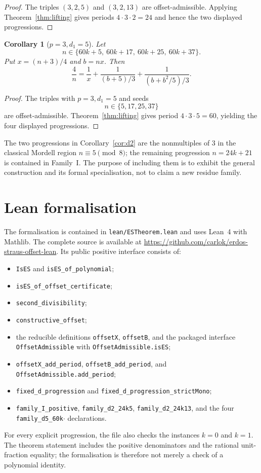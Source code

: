 \documentclass[11pt]{article}
\newtheorem{corollary}[theorem]{Corollary}
\theoremstyle{remark}
\begin{document}
\begin{proof}
The triples \((3,2,5)\) and \((3,2,13)\) are offset-admissible.  Applying
Theorem~\ref{thm:lifting} gives periods \(4\cdot3\cdot2=24\) and hence the two
displayed progressions.
\end{proof}

\begin{corollary}[\(p=3,d_1=5\)]\label{cor:d5}
Let
\[
  n\in
  \{60k+5,\ 60k+17,\ 60k+25,\ 60k+37\}.
\]
Put \(x=(n+3)/4\) and \(b=nx\).  Then
\[
  \frac4n
  =\frac1x
   +\frac1{(b+5)/3}
   +\frac1{(b+b^2/5)/3}.
\]
\end{corollary}

\begin{proof}
The triples with \(p=3,d_1=5\) and seeds
\[
  n\in\{5,17,25,37\}
\]
are offset-admissible.  Theorem~\ref{thm:lifting} gives period
\(4\cdot3\cdot5=60\), yielding the four displayed progressions.
\end{proof}

The two progressions in Corollary~\ref{cor:d2} are the nonmultiples of \(3\)
in the classical Mordell region \(n\equiv5\pmod8\); the remaining progression
\(n=24k+21\) is contained in Family~I.  The purpose of including them is to
exhibit the general construction and its formal specialisation, not to claim a
new residue family.

\section{Lean formalisation}

The formalisation is contained in \texttt{lean/ESTheorem.lean} and uses Lean~4
with Mathlib.  The complete source is available at
\url{https://github.com/carlok/erdos-straus-offset-lean}.  Its public positive
interface consists of:
\begin{itemize}
  \item \texttt{IsES} and \texttt{isES\_of\_polynomial};
  \item \texttt{isES\_of\_offset\_certificate};
  \item \texttt{second\_divisibility};
  \item \texttt{constructive\_offset};
  \item the reducible definitions \texttt{offsetX}, \texttt{offsetB}, and the
        packaged interface \texttt{OffsetAdmissible} with
        \texttt{OffsetAdmissible.isES};
  \item \texttt{offsetX\_add\_period}, \texttt{offsetB\_add\_period}, and
        \texttt{OffsetAdmissible.add\_period};
  \item \texttt{fixed\_d\_progression} and
        \texttt{fixed\_d\_progression\_strictMono};
  \item \texttt{family\_I\_positive}, \texttt{family\_d2\_24k5},
        \texttt{family\_d2\_24k13}, and the four
        \texttt{family\_d5\_60k\(\cdot\)} declarations.
\end{itemize}
For every explicit progression, the file also checks the instances \(k=0\) and
\(k=1\).  The theorem statement includes the positive denominators and the
rational unit-fraction equality; the formalisation is therefore not merely a
check of a polynomial identity.
\end{document}
